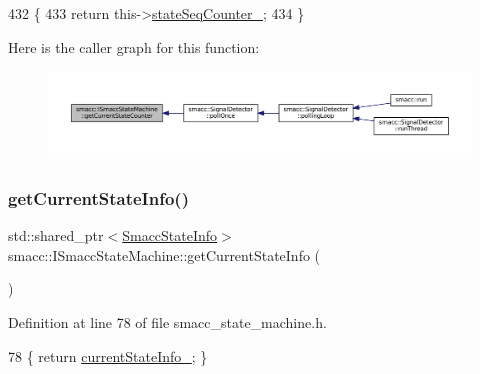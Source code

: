 \begin{DoxyCode}
432 \{
433     \textcolor{keywordflow}{return} this->\hyperlink{classsmacc_1_1ISmaccStateMachine_ab41ee07d20715142e2f7c92d551b2bd6}{stateSeqCounter\_};
434 \}
\end{DoxyCode}
Here is the caller graph for this function\+:
\nopagebreak
\begin{figure}[H]
\begin{center}
\leavevmode
\includegraphics[width=350pt]{classsmacc_1_1ISmaccStateMachine_aad27c0182b53245d0aded22e63cd83bd_icgraph}
\end{center}
\end{figure}
\mbox{\label{classsmacc_1_1ISmaccStateMachine_a4738679e8e5f7adab35e610dce0bfff7}} 
\subsubsection{\texorpdfstring{get\+Current\+State\+Info()}{getCurrentStateInfo()}}
{\footnotesize\ttfamily std\+::shared\+\_\+ptr$<$\hyperlink{classsmacc_1_1introspection_1_1SmaccStateInfo}{Smacc\+State\+Info}$>$ smacc\+::\+I\+Smacc\+State\+Machine\+::get\+Current\+State\+Info (\begin{DoxyParamCaption}{ }\end{DoxyParamCaption})\hspace{0.3cm}{\ttfamily [inline]}}



Definition at line 78 of file smacc\+\_\+state\+\_\+machine.\+h.


\begin{DoxyCode}
78 \{ \textcolor{keywordflow}{return} \hyperlink{classsmacc_1_1ISmaccStateMachine_a95e42f735cecdc231ad5372bf9fe7eaf}{currentStateInfo\_}; \}
\end{DoxyCode}
\mbox{\label{classsmacc_1_1ISmaccStateMachine_aeda2d6813c6c428bf318a5792e014b61}} 
